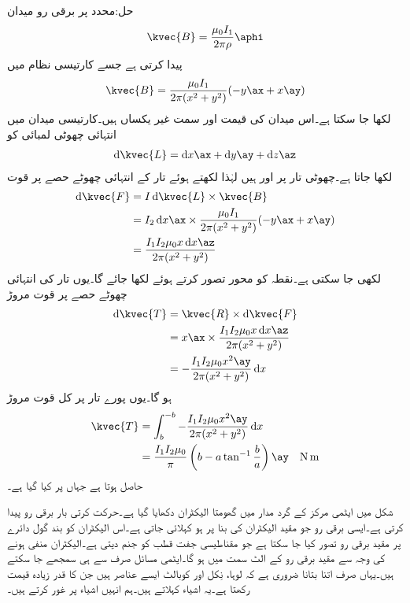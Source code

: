 حل:محدد  پر برقی رو میدان 
\begin{align*}
\kvec{B}=\frac{\mu_0 I_1}{2\pi \rho}\aphi
\end{align*}
پیدا کرتی ہے جسے کارتیسی نظام میں
\begin{align*}
\kvec{B}=\frac{\mu_0 I_1}{2\pi(x^2+y^2)} (-y\ax+x\ay)
\end{align*}
لکھا جا سکتا ہے۔اس میدان کی قیمت اور سمت غیر یکساں ہیں۔کارتیسی میدان میں انتہائی چھوٹی لمبائی کو
\begin{align*}
\dif \kvec{L}=\dif x \ax+\dif y \ay +\dif z \az
\end{align*}
لکھا جاتا ہے۔چھوٹی تار پر  اور  ہیں لہٰذا  لکھتے ہوئے تار کے انتہائی چھوٹے حصے پر قوت
\begin{align*}
\dif \kvec{F}&=I \dif \kvec{L} \times \kvec{B}\\
&=I_2 \dif x \ax \times \frac{\mu_0 I_1}{2\pi(x^2+y^2)} (-y\ax+x\ay)\\
&=\frac{I_1 I_2 \mu_0 x \dif x \az}{2\pi (x^2+y^2)}
\end{align*}
لکھی جا سکتی ہے۔نقطہ  کو محور تصور کرتے ہوئے  لکھا جائے گا۔یوں تار کی انتہائی چھوٹے حصے پر قوت مروڑ
\begin{align*}
\dif \kvec{T}&=\kvec{R} \times \dif \kvec{F}\\
&=x\ax \times \frac{I_1 I_2 \mu_0 x \dif x \az}{2\pi (x^2+y^2)}\\
&=-\frac{I_1 I_2 \mu_0 x^2 \ay}{2\pi (x^2+y^2)} \dif x
\end{align*}
ہو گا۔یوں پورے تار پر کل قوت مروڑ
\begin{align*}
\kvec{T}&=\int_{b}^{-b}-\frac{I_1 I_2 \mu_0 x^2 \ay}{2\pi (x^2+y^2)} \dif x\\
&=\frac{I_1 I_2 \mu_0}{\pi} \left(b-a \tan^{-1} \frac{b}{a}\right)\ay \quad \si{\newton \meter}
\end{align*}
حاصل ہوتا ہے جہاں  پر کیا گیا ہے۔

شکل  میں ایٹمی مرکز کے گرد مدار میں گھومتا الیکٹران دکھایا گیا ہے۔حرکت کرتی بار برقی رو پیدا کرتی ہے۔ایسی برقی رو جو مقید الیکٹران کی بنا پر ہو    کہلائی جاتی  ہے۔اس الیکٹران کو بند گول دائرے پر مقید برقی رو تصور کیا جا سکتا ہے جو مقناطیسی جفت قطب  کو جنم دیتی ہے۔الیکٹران منفی ہونے کی وجہ سے   مقید برقی  رو   کے الٹ سمت میں ہو گا۔ایٹمی مسائل صرف  سے ہی سمجھے جا سکتے ہیں۔یہاں صرف اتنا بتانا ضروری ہے کہ لوہا، نِکل اور کوبالٹ  ایسے  عناصر ہیں جن کا   قدر زیادہ قیمت رکھتا ہے۔یہ اشیاء  کہلاتے ہیں۔ہم انہیں اشیاء پر غور کرتے ہیں۔

